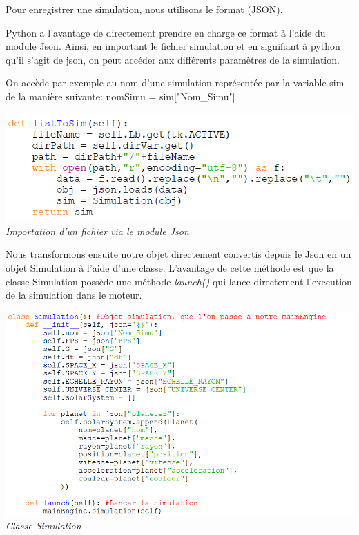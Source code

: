 \documentclass{article}
\begin{document}
    Pour enregistrer une simulation, nous utilisons le format  (JSON). 

    Python a l'avantage de directement prendre en charge ce format à l'aide du module Json. Ainsi, en important le fichier simulation et en signifiant à python qu'il s'agit de json, on peut accéder aux différents paramètres de la simulation.

    On accède par exemple au nom d'une simulation représentée par la variable sim de la manière suivante: nomSimu = sim["Nom\_Simu"]
    
    \begin{center}
        \includegraphics[scale=0.7]{toJson.png} \\   
        \emph{Importation d'un fichier via le module Json}
    \end{center}

    Nous transformons ensuite notre objet directement convertis depuis le Json en un objet Simulation à l'aide d'une classe. L'avantage de cette méthode est que la classe Simulation possède une méthode \emph{launch()} qui lance directement l'execution de la simulation dans le moteur.
    
    \begin{center}
        \includegraphics[scale=0.5]{simulationClasse.png} \\   
        \emph{Classe Simulation}
    \end{center}
\end{document}
